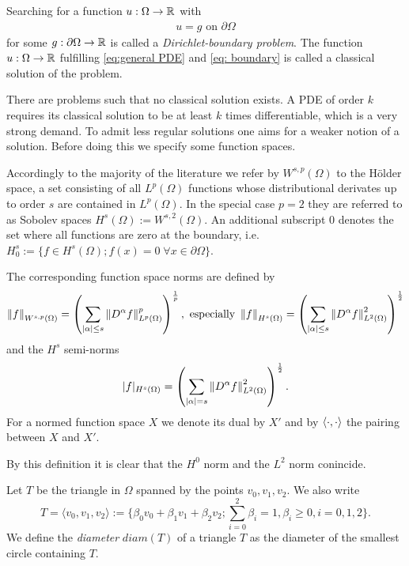Searching for a function $u:\Omega \rightarrow \mathbb{R}$ with 
\begin{align}
u=g \text{ on } \partial \Omega \label{eq: boundary}
\end{align}
for some $g:\partial \Omega \rightarrow \mathbb{R}$ is called a \emph{Dirichlet-boundary problem}. The function $u:\Omega \rightarrow \mathbb{R}$ fulfilling \eqref{eq:general PDE} and \eqref{eq: boundary} is called a classical solution of the problem. 

There are problems such that no classical solution exists. A PDE of order $k$ requires its classical solution to be at least $k$ times differentiable, which is a very strong demand. To admit less regular solutions one aims for a weaker notion of a solution. Before doing this we specify some function spaces.

\begin{definition} \label{def: function spaces and norms}
Accordingly to the majority of the literature we refer by $W^{s,p}(\Omega)$ to the H\"older space, a set consisting of all $L^p(\Omega)$ functions whose distributional derivates up to order $s$ are contained in $L^ p(\Omega)$.
In the special case $p=2$ they are referred to as Sobolev spaces $H^s(\Omega):=W^{s,2}(\Omega)$. An additional subscript $0$ denotes the set where all functions are zero at the boundary, i.e. $H^s_0 :=\{f \in H^s(\Omega); f(x)=0 \; \forall x \in \partial \Omega\}$.

The corresponding function space norms are defined by
\[
	\left\lVert f \right\rVert _{W^{s,p}(\Omega)} = \left( \sum_{|\alpha| \leq s} \left\lVert D^\alpha f \right\rVert^p_{L^p(\Omega)}\right)^{\frac 1 p }, \text{   especially } \left\lVert f \right\rVert _{H^{s}(\Omega)}=\left( \sum_{|\alpha| \leq s} \left\lVert D^\alpha f \right\rVert^2_{L^2(\Omega)}\right)^{\frac 1 2 }
\]
and the $H^s$ semi-norms
\[ 
 	|f|_{H^{s}(\Omega)}=\left( \sum_{|\alpha| = s} \left\lVert D^\alpha f \right\rVert^2_{L^2(\Omega)}\right)^{\frac 1 2 }.
\]
For a normed function space $X$ we denote its dual by $X'$ and by $ \langle \cdot, \cdot \rangle$ the pairing between $X$ and $X'$.

\end{definition}
By this definition it is clear that the $H^0$ norm and the $L^2$ norm conincide. 

Let $T$ be the triangle in $\Omega$ spanned by the points $v_0, v_1, v_2$. We also write 
\[
	T= \langle v_0, v_1, v_2 \rangle := \{\beta_0 v_0+ \beta_1 v_1 +\beta_2 v_2; \sum_{i=0}^2 \beta_i =1, \beta_i \geq 0, i= 0,1,2\}.
\]
We define the \emph{diameter} $diam(T)$ of a triangle $T$ as the diameter of the smallest circle containing $T$.

